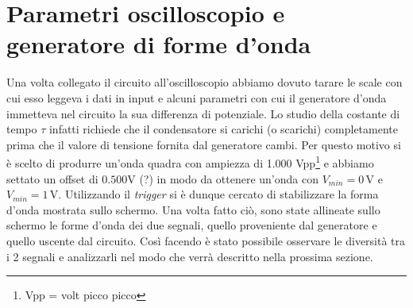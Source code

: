 \section{Parametri oscilloscopio e generatore di forme d'onda}

Una volta collegato il circuito all'oscilloscopio abbiamo dovuto tarare le scale con cui esso leggeva i dati in input e alcuni parametri con cui il generatore d'onda immetteva nel circuito la sua differenza di potenziale. Lo studio della costante di tempo $\tau$ infatti richiede che il condensatore si carichi (o scarichi) completamente prima che il valore di tensione fornita dal generatore cambi. Per questo motivo si è scelto di produrre un'onda quadra con ampiezza di 1.000 Vpp\footnote{Vpp = volt picco picco} e abbiamo settato un offset di $0.500\si{\volt}$ (?) in modo da ottenere un'onda con $V_{min}=0\,\si{\volt}$ e $V_{min}=1\,\si{\volt}$. Utilizzando il \textit{trigger} si è dunque cercato di stabilizzare la forma d'onda mostrata sullo schermo. Una volta fatto ciò, sono state allineate sullo schermo le forme d'onda dei due segnali, quello proveniente dal generatore e quello uscente dal circuito. Così facendo è stato possibile osservare le diversità tra i 2 segnali e analizzarli nel modo che verrà descritto nella prossima sezione.
 
